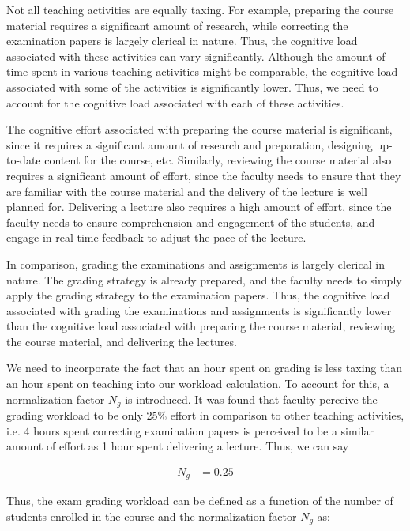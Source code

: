 Not all teaching activities are equally taxing. For example, preparing the course material requires a significant amount of research, while correcting the examination papers is largely clerical in nature. Thus, the cognitive load associated with these activities can vary significantly. Although the amount of time spent in various teaching activities might be comparable, the cognitive load associated with some of the activities is significantly lower. Thus, we need to account for the cognitive load associated with each of these activities.

The cognitive effort associated with preparing the course material is significant, since it requires a significant amount of research and preparation, designing up-to-date content for the course, etc. Similarly, reviewing the course material also requires a significant amount of effort, since the faculty needs to ensure that they are familiar with the course material and the delivery of the lecture is well planned for. Delivering a lecture also requires a high amount of effort, since the faculty needs to ensure comprehension and engagement of the students, and engage in real-time feedback to adjust the pace of the lecture.

In comparison, grading the examinations and assignments is largely clerical in nature. The grading strategy is already prepared, and the faculty needs to simply apply the grading strategy to the examination papers. Thus, the cognitive load associated with grading the examinations and assignments is significantly lower than the cognitive load associated with preparing the course material, reviewing the course material, and delivering the lectures.

We need to incorporate the fact that an hour spent on grading is less taxing than an hour spent on teaching into our workload calculation. To account for this, a normalization factor \(N_g\) is introduced. It was found that faculty perceive the grading workload to be only 25\% effort in comparison to other teaching activities, i.e. 4 hours spent correcting examination papers is perceived to be a similar amount of effort as 1 hour spent delivering a lecture. Thus, we can say

\begin{equation*}
  \begin{aligned}
    N_g & = 0.25
  \end{aligned}
\end{equation*}


Thus, the exam grading workload can be defined as a function of the number of students enrolled in the course and the normalization factor \(N_g\) as:


